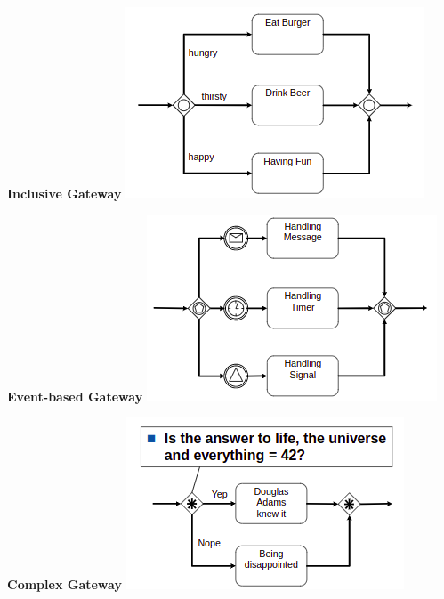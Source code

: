     \begin{minipage}[t]{0.3\textwidth}
    \centering
    \textbf{Inclusive Gateway}
    \newline
	\includegraphics[width=1.05\linewidth]{images/BPMN_inclusive-gateway.png}
    \end{minipage}
    \begin{minipage}[t]{0.3\textwidth}
    \centering
    \textbf{Event-based Gateway}
    \newline
	\includegraphics[width=1.05\linewidth]{images/BPMN_event-based-gateway.png}
    \end{minipage}
    \begin{minipage}[t]{0.3\textwidth}
    \centering
    \textbf{Complex Gateway}
    \newline
	\includegraphics[width=1.05\linewidth]{images/BPMN_complex-gateway.png}
    \end{minipage}
    
